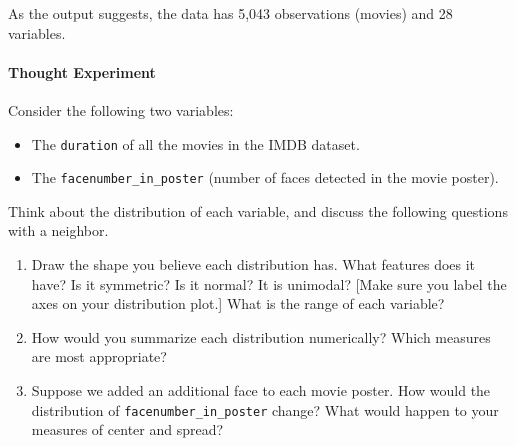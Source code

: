 \documentclass[10pt]{article}\usepackage[]{graphicx}\usepackage[]{color}
\newcommand{\mediumans}{\vspace{1.5in}}
\newcommand{\ans}{\vspace{0.25in}}
\begin{document}
As the output suggests, the data has 5,043 observations (movies) and 28 variables. 


\paragraph{Thought Experiment}
Consider the following two variables:
\begin{itemize}
  \item The \verb#duration# of all the movies in the IMDB dataset. 
  \item The \verb#facenumber_in_poster# (number of faces detected in the movie poster). 
\end{itemize}

Think about the distribution of each variable, and discuss the following questions with a neighbor.
\begin{enumerate}
  \itemsep0.3in
  \item Draw the shape you believe each distribution has.  What features does it have? Is it symmetric? Is it normal? It is unimodal? [Make sure you label the axes on your distribution plot.] What is the range of each variable? 
  \mediumans
  \item How would you summarize each distribution numerically? Which measures are most appropriate?
  \item Suppose we added an additional face to each movie poster. How would the distribution of \verb#facenumber_in_poster# change? What would happen to your measures of center and spread? 
  \ans
\end{enumerate}
\end{document}
